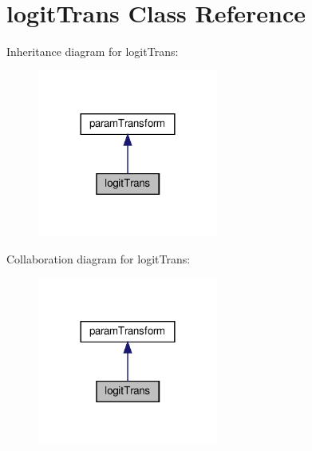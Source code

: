 \hypertarget{classlogitTrans}{}\section{logit\+Trans Class Reference}
\label{classlogitTrans}


Inheritance diagram for logit\+Trans\+:
\nopagebreak
\begin{figure}[H]
\begin{center}
\leavevmode
\includegraphics[width=168pt]{classlogitTrans__inherit__graph}
\end{center}
\end{figure}


Collaboration diagram for logit\+Trans\+:
\nopagebreak
\begin{figure}[H]
\begin{center}
\leavevmode
\includegraphics[width=168pt]{classlogitTrans__coll__graph}
\end{center}
\end{figure}

